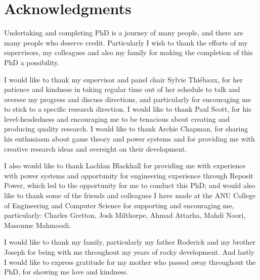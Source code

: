 \chapter*{Acknowledgments}

Undertaking and completing PhD is a journey of many people, and there are many people who deserve credit.
Particularly I wish to thank the efforts of my supervisors, my colleagues and also my family for making the completion of this PhD a possibility.

I would like to thank my supervisor and panel chair Sylvie Thi\'{e}baux, for her patience and kindness in taking regular time out of her schedule to talk and oversee my progress and discuss directions, and particularly for encouraging me to stick to a specific research direction.
I would like to thank Paul Scott, for his level-headedness and encouraging me to be tenacious about creating and producing quality research.
I would like to thank Archie Chapman, for sharing his enthusiasm about game theory and power systems and for providing me with creative research ideas and oversight on their development.

I also would like to thank Lachlan Blackhall for providing me with experience with power systems and opportunity for engineering experience through Reposit Power, which led to the opportunity for me to conduct this PhD; and would also like to thank some of the friends and colleagues I have made at the ANU College of Engineering and Computer Science for supporting and encouraging me, particularly: Charles Gretton, Josh Milthorpe, Ahmad Attarha, Mahdi Noori, Masoume Mahmoodi.

I would like to thank my family, particularly my father Roderick and my brother Joseph for being with me throughout my years of rocky development.
And lastly I would like to express gratitude for my mother who passed away throughout the PhD, for showing me love and kindness.
